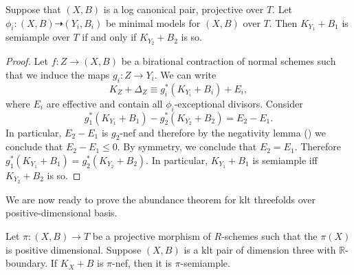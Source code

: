 	\begin{lemma}\label{inv}
		Suppose that $(X,B)$ is a log canonical pair, projective over $T$. 
		Let $\phi_{i} \colon (X, B) \dashrightarrow (Y_{i},B_{i})$ be minimal models for $(X,B)$ over $T$. 
		Then $K_{Y_{1}}+B_{1}$ is semiample over $T$ if and only if $K_{Y_{2}}+B_{2}$ is so.
	\end{lemma}
	\begin{proof}
		
		Let $f \colon Z \to (X,B)$ be a birational contraction of normal schemes such that we induce the maps $g_i \colon Z \to Y_i$. We can write
		$$K_Z+\Delta_Z \equiv g_i^*(K_{Y_i}+B_i) + E_i,$$
		where $E_i$ are effective and contain all $\phi_i$-exceptional divisors.
		Consider 
		$$g_1^*(K_{Y_1}+B_1)-g_2^*(K_{Y_2}+B_2)=E_2-E_1. $$
		In particular, $E_2-E_1$ is $g_2$-nef and therefore by the negativity lemma (\cite[Lemma 2.14]{bhatt2020}) we conclude that $E_2 -E_1 \leq 0$. By symmetry, we conclude that $E_2=E_1$. Therefore $g_1^*(K_{Y_1}+B_1)=g_2^*(K_{Y_2}+B_2)$. In particular, $K_{Y_1}+B_1$ is semiample  iff $K_{Y_2}+B_2$ is so.
	\end{proof}
	
	We are now ready to prove the abundance theorem for klt threefolds over positive-dimensional basis.
	
	\begin{theorem}\label{abundance}
		Let $\pi \colon (X,B) \to T$ be a projective morphism of $R$-schemes such that the $\pi(X)$ is positive dimensional.
		Suppose $(X,B)$ is a klt pair of dimension three with $\mathbb{R}$-boundary. If $K_X+B$ is $\pi$-nef, then it is $\pi$-semiample.
	\end{theorem}
	
